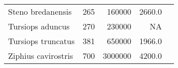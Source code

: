 \begin{longtable}{|p{1in}rrrp{1.5in}|}
           Steno bredanensis  &          265 &      160000  &       2660.0   &                                 \citet{miyazaki1994} \\
            Tursiops aduncus  &          270 &      230000  &           NA   &                                    \citet{wells1999} \\
          Tursiops truncatus  &          381 &      650000  &       1966.0   &                                   \citet{perrin1984} \\
         Ziphius cavirostris  &          700 &     3000000  &       4200.0   &                                    \citet{omura1955} \\
  \hline
\end{longtable}

\scriptsize

